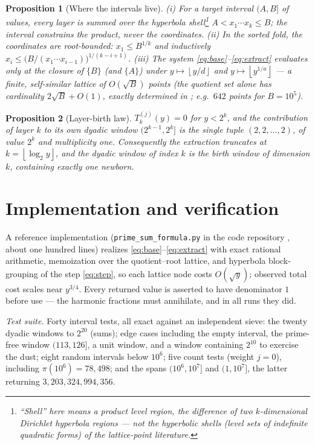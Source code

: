 \documentclass[11pt]{article}
\newtheorem{proposition}{Proposition}
\theoremstyle{remark}
\newcommand{\fl}[1]{\left\lfloor #1 \right\rfloor}
\begin{document}
\begin{proposition}[Where the intervals live]\label{prop:intervals}
(i) For a target interval $(A, B]$ of values, every layer is summed over the hyperbola
shell\footnote{``Shell'' here means a product level region, the difference of two $k$-dimensional
Dirichlet hyperbola regions --- not the hyperbolic shells (level sets of indefinite quadratic forms)
of the lattice-point literature.}
$A < x_1 \cdots x_k \le B$; the interval constrains the product, never the coordinates. (ii) In the
sorted fold, the coordinates are root-bounded: $x_1 \le B^{1/k}$ and inductively
$x_i \le \big(B/(x_1 \cdots x_{i-1})\big)^{1/(k-i+1)}$. (iii) The system
\eqref{eq:base}--\eqref{eq:extract} evaluates only at the closure of $\{B\}$ (and $\{A\}$) under
$y \mapsto \fl{y/d}$ and $y \mapsto \fl{y^{1/a}}$ --- a finite, self-similar lattice of
$O(\sqrt B)$ points (the quotient set alone has cardinality $2\sqrt B + O(1)$, exactly determined
in \cite{Heyman}; e.g.\ $642$ points for $B = 10^5$).
\end{proposition}

\begin{proposition}[Layer-birth law]\label{prop:birth}
$T_k^{(j)}(y) = 0$ for $y < 2^k$, and the contribution of layer $k$ to its own dyadic window
$(2^{k-1}, 2^k]$ is the single tuple $(2, 2, \dots, 2)$, of value $2^k$ and multiplicity one.
Consequently the extraction truncates at $k = \fl{\log_2 y}$, and the dyadic window of index $k$ is the
birth window of dimension $k$, containing exactly one newborn.
\end{proposition}

\section{Implementation and verification}

A reference implementation (\texttt{prime\_sum\_formula.py} in the code repository \cite{Code}, about
one hundred lines)
realizes \eqref{eq:base}--\eqref{eq:extract} with exact rational arithmetic, memoization over the
quotient--root lattice, and hyperbola block-grouping of the step \eqref{eq:step}, so each lattice node
costs $O(\sqrt y)$; observed total cost scales near $y^{3/4}$. Every returned value is asserted to have
denominator $1$ before use --- the harmonic fractions must annihilate, and in all runs they did.

\emph{Test suite.} Forty interval tests, all exact against an independent sieve: the twenty dyadic
windows to $2^{20}$ (sums); edge cases including the empty interval, the prime-free window
$(113, 126]$, a unit window, and a window containing $2^{10}$ to exercise the dust; eight random
intervals below $10^6$; five count tests (weight $j = 0$), including $\pi(10^6) = 78{,}498$; and the
spans $(10^6, 10^7]$ and $(1, 10^7]$, the latter returning $3{,}203{,}324{,}994{,}356$.
\end{document}
